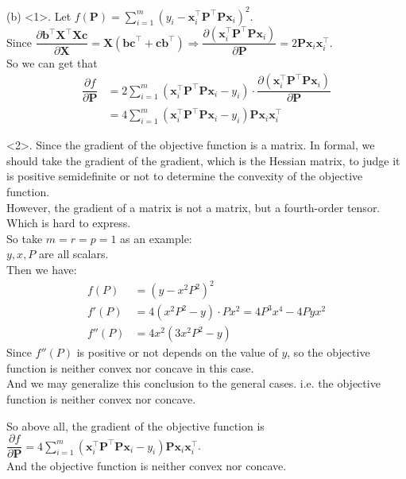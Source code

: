 (b) <1>. Let $f\left(\mathbf{P}\right)=\sum\limits_{i=1}^m\left(y_i-\mathbf{x}_i^{\top}\mathbf{P}^{\top}\mathbf{P}\mathbf{x}_i\right)^2$. \\
Since $\dfrac{\partial\mathbf{b}^{\top}\mathbf{X}^{\top}\mathbf{X}\mathbf{c}}{\partial\mathbf{X}}=\mathbf{X}\left(\mathbf{bc}^{\top}+\mathbf{cb}^{\top}\right) \Rightarrow \dfrac{\partial \left(\mathbf{x}_i^{\top}\mathbf{P}^{\top}\mathbf{Px}_i\right)}{\partial \mathbf{P}} = 2\mathbf{P}\mathbf{x}_i\mathbf{x}_i^{\top}$. \\
So we can get that
\begin{align*}
\dfrac{\partial f}{\partial \mathbf{P}} &= 2\sum_{i=1}^m\left(\mathbf{x}_i^{\top}\mathbf{P}^{\top}\mathbf{P}\mathbf{x}_i - y_i \right) \cdot \dfrac{\partial \left(\mathbf{x}_i^{\top}\mathbf{P}^{\top}\mathbf{Px}_i\right)}{\partial \mathbf{P}} \\
&= 4\sum_{i=1}^m\left(\mathbf{x}_i^{\top}\mathbf{P}^{\top}\mathbf{P}\mathbf{x}_i - y_i \right)\mathbf{P}\mathbf{x}_i\mathbf{x}_i^{\top}
\end{align*}

<2>. Since the gradient of the objective function is a matrix. In formal, we should take the gradient of the gradient, which is the Hessian matrix, to judge it is positive semidefinite or not to determine the convexity of the objective function. \\
However, the gradient of a matrix is not a matrix, but a fourth-order tensor. Which is hard to express. \\
So take $m=r=p=1$ as an example: \\
$y,x,P$ are all scalars. \\
Then we have:
\begin{align*}
f(P) &= \left(y-x^2P^2\right)^2 \\
f'(P) &= 4\left(x^2P^2-y\right)\cdot Px^2 = 4P^3x^4 - 4Pyx^2 \\
f''(P) &= 4x^2(3x^2P^2-y)
\end{align*}
Since $f''(P)$ is positive or not depends on the value of $y$, so the objective function is neither convex nor concave in this case. \\
And we may generalize this conclusion to the general cases. i.e. the objective function is neither convex nor concave.

So above all, the gradient of the objective function is $\dfrac{\partial f}{\partial \mathbf{P}} = 4\sum\limits_{i=1}^m\left(\mathbf{x}_i^{\top}\mathbf{P}^{\top}\mathbf{P}\mathbf{x}_i - y_i \right)\mathbf{P}\mathbf{x}_i\mathbf{x}_i^{\top}$. \\
And the objective function is neither convex nor concave.